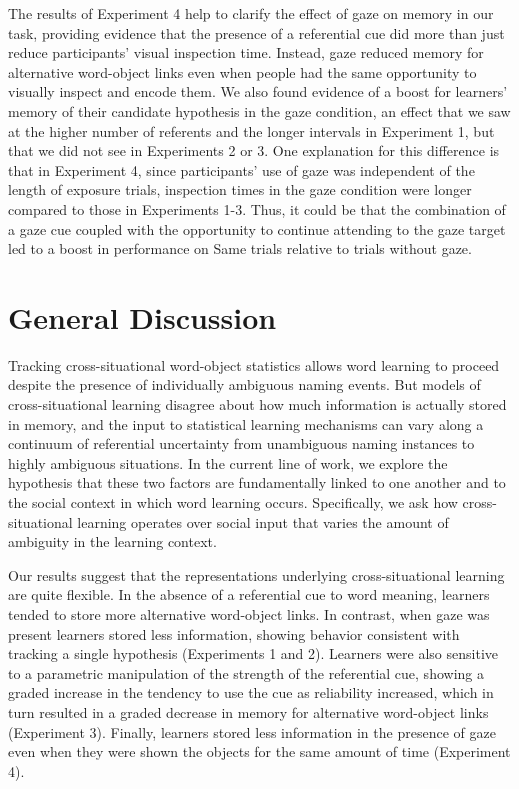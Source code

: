 \documentclass[oneside]{report}
\begin{document}
The results of Experiment 4 help to clarify the effect of gaze on memory
in our task, providing evidence that the presence of a referential cue
did more than just reduce participants' visual inspection time. Instead,
gaze reduced memory for alternative word-object links even when people
had the same opportunity to visually inspect and encode them. We also
found evidence of a boost for learners' memory of their candidate
hypothesis in the gaze condition, an effect that we saw at the higher
number of referents and the longer intervals in Experiment 1, but that
we did not see in Experiments 2 or 3. One explanation for this
difference is that in Experiment 4, since participants' use of gaze was
independent of the length of exposure trials, inspection times in the
gaze condition were longer compared to those in Experiments 1-3. Thus,
it could be that the combination of a gaze cue coupled with the
opportunity to continue attending to the gaze target led to a boost in
performance on Same trials relative to trials without gaze.

\hypertarget{general-discussion}{%
\section{General Discussion}\label{general-discussion}}

Tracking cross-situational word-object statistics allows word learning
to proceed despite the presence of individually ambiguous naming events.
But models of cross-situational learning disagree about how much
information is actually stored in memory, and the input to statistical
learning mechanisms can vary along a continuum of referential
uncertainty from unambiguous naming instances to highly ambiguous
situations. In the current line of work, we explore the hypothesis that
these two factors are fundamentally linked to one another and to the
social context in which word learning occurs. Specifically, we ask how
cross-situational learning operates over social input that varies the
amount of ambiguity in the learning context.

Our results suggest that the representations underlying
cross-situational learning are quite flexible. In the absence of a
referential cue to word meaning, learners tended to store more
alternative word-object links. In contrast, when gaze was present
learners stored less information, showing behavior consistent with
tracking a single hypothesis (Experiments 1 and 2). Learners were also
sensitive to a parametric manipulation of the strength of the
referential cue, showing a graded increase in the tendency to use the
cue as reliability increased, which in turn resulted in a graded
decrease in memory for alternative word-object links (Experiment 3).
Finally, learners stored less information in the presence of gaze even
when they were shown the objects for the same amount of time (Experiment
4).
\end{document}
